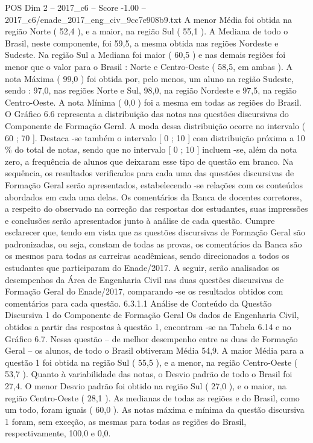 \begin{textsample}{POS Dim 2 – 2017\_c6 – Score -1.00 – 2017\_c6/enade\_2017\_eng\_civ\_9cc7e908b9.txt}
A menor Média foi obtida na região Norte ( 52,4 ), e a maior, na região Sul ( 55,1 ).
A Mediana de todo o Brasil, neste componente, foi 59,5, a mesma obtida nas regiões Nordeste e Sudeste.
Na região Sul a Mediana foi maior ( 60,5 ) e nas demais regiões foi menor que o valor para o Brasil : Norte e Centro-Oeste ( 58,5, em ambas ).
A nota Máxima ( 99,0 ) foi obtida por, pelo menos, um aluno na região Sudeste, sendo : 97,0, nas regiões Norte e Sul, 98,0, na região Nordeste e 97,5, na região Centro-Oeste.
A nota Mínima ( 0,0 ) foi a mesma em todas as regiões do Brasil.
O Gráfico 6.6 representa a distribuição das notas nas questões discursivas do Componente de Formação Geral.
A moda dessa distribuição ocorre no intervalo ( 60 ; 70 ].
Destaca -se também o intervalo [ 0 ; 10 ] com distribuição próxima a 10 \% do total de notas, sendo que no intervalo [ 0 ; 10 ] incluem -se, além da nota zero, a frequência de alunos que deixaram esse tipo de questão em branco.
Na sequência, os resultados verificados para cada uma das questões discursivas de Formação Geral serão apresentados, estabelecendo -se relações com os conteúdos abordados em cada uma delas.
Os comentários da Banca de docentes corretores, a respeito do observado na correção das respostas dos estudantes, suas impressões e conclusões serão apresentados junto à análise de cada questão.
Cumpre esclarecer que, tendo em vista que as questões discursivas de Formação Geral são padronizadas, ou seja, constam de todas as provas, os comentários da Banca são os mesmos para todas as carreiras acadêmicas, sendo direcionados a todos os estudantes que participaram do Enade/2017.
A seguir, serão analisados os desempenhos da Área de Engenharia Civil nas duas questões discursivas de Formação Geral do Enade/2017, comparando -se os resultados obtidos com comentários para cada questão. 6.3.1.1 Análise de Conteúdo da Questão Discursiva 1 do Componente de Formação Geral Os dados de Engenharia Civil, obtidos a partir das respostas à questão 1, encontram -se na Tabela 6.14 e no Gráfico 6.7.
Nessa questão – de melhor desempenho entre as duas de Formação Geral – os alunos, de todo o Brasil obtiveram Média 54,9.
A maior Média para a questão 1 foi obtida na região Sul ( 55,5 ), e a menor, na região Centro-Oeste ( 53,7 ).
Quanto à variabilidade das notas, o Desvio padrão de todo o Brasil foi 27,4.
O menor Desvio padrão foi obtido na região Sul ( 27,0 ), e o maior, na região Centro-Oeste ( 28,1 ).
As medianas de todas as regiões e do Brasil, como um todo, foram iguais ( 60,0 ).
As notas máxima e mínima da questão discursiva 1 foram, sem exceção, as mesmas para todas as regiões do Brasil, respectivamente, 100,0 e 0,0.

\end{textsample}
